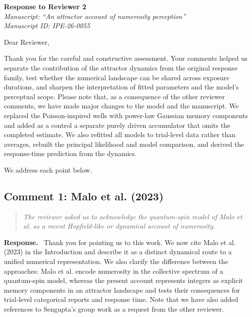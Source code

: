 \documentclass[11pt]{article}
\newenvironment{reviewercomment}{\begin{quote}\color{reviewgray}\itshape}{\end{quote}}
\newenvironment{authorresponse}{\par\noindent\textbf{\color{responseblue}Response.}\ }{\par}
\begin{document}
\begin{center}
{\Large\bfseries Response to Reviewer 2}\\[0.5em]
{\itshape Manuscript: ``An attractor account of numerosity perception''}\\[0.25em]
{\itshape Manuscript ID: IPE-26-0055}
\end{center}

Dear Reviewer,

Thank you for the careful and constructive assessment. Your comments helped us separate the contribution of the attractor dynamics from the original response family, test whether the numerical landscape can be shared across exposure durations, and sharpen the interpretation of fitted parameters and the model's perceptual scope. Please note that, as a consequence of the other reviewer comments, we have made major changes to the model and the manuscript. We replaced the Poisson-inspired wells with power-law Gaussian memory components and added as a control a separate purely driven accumulator that omits the completed estimate. We also refitted all models to trial-level data rather than averages, rebuilt the principal likelihood and model comparison, and derived the response-time prediction from the dynamics.

We address each point below.

\subsection*{Comment 1: Malo et al. (2023)}

\begin{reviewercomment}
The reviewer asked us to acknowledge the quantum-spin model of Malo et al. as a recent Hopfield-like or dynamical account of numerosity.
\end{reviewercomment}

\begin{authorresponse}
Thank you for pointing us to this work. We now cite Malo et al. (2023) in the Introduction and describe it as a distinct dynamical route to a unified numerical representation. We also clarify the difference between the approaches: Malo et al. encode numerosity in the collective spectrum of a quantum-spin model, whereas the present account represents integers as explicit memory components in an attractor landscape and tests their consequences for trial-level categorical reports and response time. Note that we have also added references to Sengupta's group work as a request from the other reviewer.
\end{authorresponse}
\end{document}
